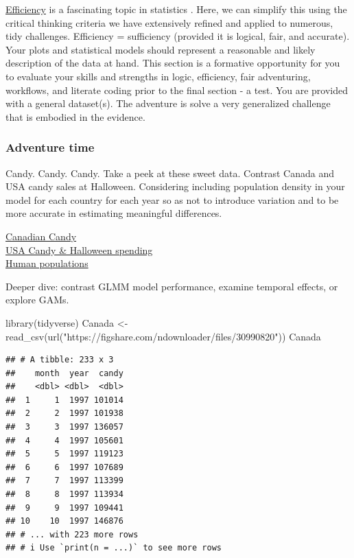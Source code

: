 \documentclass[
]{book}
\newenvironment{Shaded}{\begin{snugshade}}{\end{snugshade}}
\newcommand{\FunctionTok}[1]{\textcolor[rgb]{0.00,0.00,0.00}{#1}}
\newcommand{\NormalTok}[1]{#1}
\newcommand{\OtherTok}[1]{\textcolor[rgb]{0.56,0.35,0.01}{#1}}
\newcommand{\StringTok}[1]{\textcolor[rgb]{0.31,0.60,0.02}{#1}}
\begin{document}
\href{https://en.wikipedia.org/wiki/Efficiency_(statistics)}{Efficiency} is a fascinating topic in statistics \citep{RN7261, RN7260, RN7259}. Here, we can simplify this using the critical thinking criteria we have extensively refined and applied to numerous, tidy challenges. Efficiency = sufficiency (provided it is logical, fair, and accurate). Your plots and statistical models should represent a reasonable and likely description of the data at hand. This section is a formative opportunity for you to evaluate your skills and strengths in logic, efficiency, fair adventuring, workflows, and literate coding prior to the final section - a test. You are provided with a general dataset(s). The adventure is solve a very generalized challenge that is embodied in the evidence.

\hypertarget{adventure-time-4}{%
\subsubsection*{Adventure time}\label{adventure-time-4}}

Candy. Candy. Candy. Take a peek at these sweet data. Contrast Canada and USA candy sales at Halloween. Considering including population density in your model for each country for each year so as not to introduce variation and to be more accurate in estimating meaningful differences.

\href{https://figshare.com/articles/dataset/Canadian_Candy_Sales/9876386}{Canadian Candy}\\
\href{https://figshare.com/articles/dataset/USA_Halloween_spending/13125572}{USA Candy \& Halloween spending}\\
\href{https://figshare.com/articles/dataset/World_human_populations/16746652}{Human populations}

Deeper dive: contrast GLMM model performance, examine temporal effects, or explore GAMs.

\begin{Shaded}
\begin{Highlighting}[]
\FunctionTok{library}\NormalTok{(tidyverse)}
\NormalTok{Canada }\OtherTok{\textless{}{-}} \FunctionTok{read\_csv}\NormalTok{(}\FunctionTok{url}\NormalTok{(}\StringTok{"https://figshare.com/ndownloader/files/30990820"}\NormalTok{))}
\NormalTok{Canada}
\end{Highlighting}
\end{Shaded}

\begin{verbatim}
## # A tibble: 233 x 3
##    month  year  candy
##    <dbl> <dbl>  <dbl>
##  1     1  1997 101014
##  2     2  1997 101938
##  3     3  1997 136057
##  4     4  1997 105601
##  5     5  1997 119123
##  6     6  1997 107689
##  7     7  1997 113399
##  8     8  1997 113934
##  9     9  1997 109441
## 10    10  1997 146876
## # ... with 223 more rows
## # i Use `print(n = ...)` to see more rows
\end{verbatim}
\end{document}
